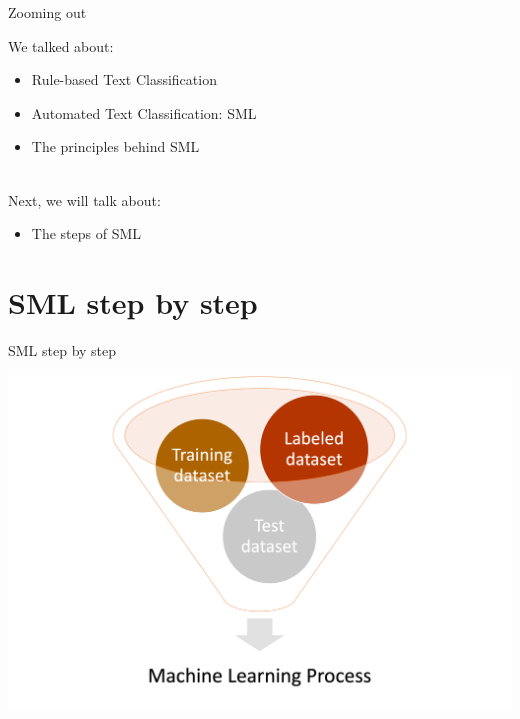 \documentclass[handout]{beamer}
\begin{document}
	
	
	\begin{frame}{Zooming out} 
		
		We talked about:
		\begin{itemize}
			\item Rule-based Text Classification
			\item Automated Text Classification: SML
			\item The principles behind SML \\\
		\end{itemize}
		
		Next, we will talk about:
		\begin{itemize}
			\item The steps of SML
		\end{itemize}
		
	\end{frame}
	
	
	\section{SML step by step}
	
	\begin{frame}{SML step by step}
		
		\begin{center}
			\includegraphics[width=\linewidth,height=\textheight,keepaspectratio]{../pictures/MLingredients.png} \\\
		\end{center}
		
		
		
	\end{frame}
	
\end{document}
